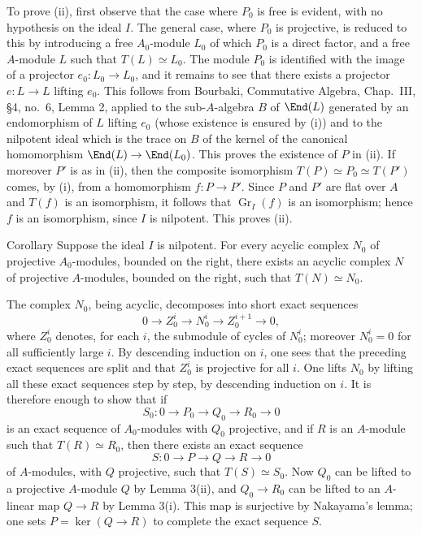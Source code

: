To prove (ii), first observe that the case where $P_0$ is free is evident, with no hypothesis on the ideal $I$. The general case, where $P_0$ is projective, is reduced to this by introducing a free $A_0$-module $L_0$ of which $P_0$ is a direct factor, and a free $A$-module $L$ such that $T(L)\simeq L_0$. The module $P_0$ is identified with the image of a projector $e_0:L_0\to L_0$, and it remains to see that there exists a projector $e:L\to L$ lifting $e_0$. This follows from Bourbaki, Commutative Algebra, Chap.~III, §4, no.~6, Lemma 2, applied to the sub-$A$-algebra $B$ of $\End(L)$ generated by an endomorphism of $L$ lifting $e_0$ (whose existence is ensured by (i)) and to the nilpotent ideal which is the trace on $B$ of the kernel of the canonical homomorphism $\End(L)\to\End(L_0)$. This proves the existence of $P$ in (ii). If moreover $P'$ is as in (ii), then the composite isomorphism $T(P)\simeq P_0\simeq T(P')$ comes, by (i), from a homomorphism $f:P\to P'$. Since $P$ and $P'$ are flat over $A$ and $T(f)$ is an isomorphism, it follows that $\operatorname{Gr}_I(f)$ is an isomorphism; hence $f$ is an isomorphism, since $I$ is nilpotent. This proves (ii).

\begin{statement}{Corollary}
Suppose the ideal $I$ is nilpotent. For every acyclic complex $N_0$ of projective $A_0$-modules, bounded on the right, there exists an acyclic complex $N$ of projective $A$-modules, bounded on the right, such that $T(N)\simeq N_0$.
\end{statement}

The complex $N_0$, being acyclic, decomposes into short exact sequences
\[
0\longrightarrow Z_0^i\longrightarrow N_0^i\longrightarrow Z_0^{i+1}\longrightarrow0,
\]
where $Z_0^i$ denotes, for each $i$, the submodule of cycles of $N_0^i$; moreover $N_0^i=0$ for all sufficiently large $i$. By descending induction on $i$, one sees that the preceding exact sequences are split and that $Z_0^i$ is projective for all $i$. One lifts $N_0$ by lifting all these exact sequences step by step, by descending induction on $i$. It is therefore enough to show that if
\[
S_0:0\longrightarrow P_0\longrightarrow Q_0\longrightarrow R_0\longrightarrow0
\]
is an exact sequence of $A_0$-modules with $Q_0$ projective, and if $R$ is an $A$-module such that $T(R)\simeq R_0$, then there exists an exact sequence
\[
S:0\longrightarrow P\longrightarrow Q\longrightarrow R\longrightarrow0
\]
of $A$-modules, with $Q$ projective, such that $T(S)\simeq S_0$. Now $Q_0$ can be lifted to a projective $A$-module $Q$ by Lemma 3(ii), and $Q_0\to R_0$ can be lifted to an $A$-linear map $Q\to R$ by Lemma 3(i). This map is surjective by Nakayama's lemma; one sets $P=\ker(Q\to R)$ to complete the exact sequence $S$.

